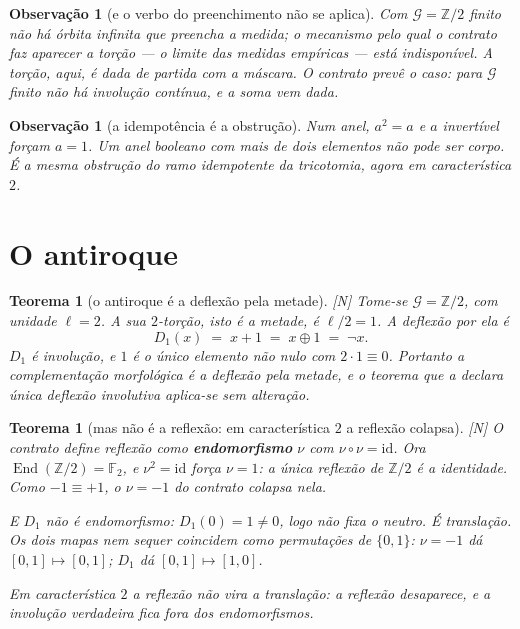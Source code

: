 \documentclass[12pt,a4paper]{article}
\newcommand{\ZZ}{\mathbb{Z}}
\newcommand{\FF}{\mathbb{F}_2}
\newcommand{\GG}{\mathcal{G}}
\newcommand{\est}[1]{\textsf{\footnotesize[#1]}}
\newtheorem{teorema}[definicao]{Teorema}
\newtheorem{observacao}[definicao]{Observação}
\begin{document}
\begin{observacao}[e o verbo do preenchimento não se aplica]\label{obs:naopreenche}
Com $\GG=\ZZ/2$ finito não há órbita infinita que preencha a medida; o mecanismo pelo qual o contrato faz
\emph{aparecer} a torção --- o limite das medidas empíricas --- está indisponível. A torção, aqui, é dada de
partida com a máscara. O contrato prevê o caso: para $\GG$ finito não há involução contínua, e a soma vem dada.
\end{observacao}

\begin{observacao}[a idempotência é a obstrução]\label{obs:idem}
Num anel, $a^2=a$ e $a$ invertível forçam $a=1$. Um anel booleano com mais de dois elementos não pode ser corpo.
É a mesma obstrução do ramo idempotente da tricotomia, agora em característica $2$.
\end{observacao}

\section{O antiroque}

\begin{teorema}[o antiroque é a deflexão pela metade]\label{teo:antiroquemetade}
\est{N} Tome-se $\GG=\ZZ/2$, com unidade $\ell=2$. A sua $2$-torção, isto é a metade, é $\ell/2=1$. A deflexão
por ela é
\[
D_1(x)\;=\;x+1\;=\;x\oplus1\;=\;\neg x .
\]
$D_1$ é involução, e $1$ é o único elemento não nulo com $2\cdot1\equiv0$. Portanto a complementação morfológica
é a deflexão pela metade, e o teorema que a declara única deflexão involutiva aplica-se sem alteração.
\end{teorema}

\begin{teorema}[mas não é a reflexão: em característica $2$ a reflexão colapsa]\label{teo:naoereflexao}
\est{N} O contrato define \emph{reflexão} como \textbf{endomorfismo} $\nu$ com $\nu\circ\nu=\mathrm{id}$. Ora
$\operatorname{End}(\ZZ/2)=\FF$, e $\nu^2=\mathrm{id}$ força $\nu=1$: a única reflexão de $\ZZ/2$ é a
\emph{identidade}. Como $-1\equiv+1$, o $\nu=-1$ do contrato colapsa nela.

\noindent E $D_1$ não é endomorfismo: $D_1(0)=1\neq0$, logo não fixa o neutro. É translação. Os dois mapas nem
sequer coincidem como permutações de $\{0,1\}$: $\nu=-1$ dá $[0,1]\mapsto[0,1]$; $D_1$ dá $[0,1]\mapsto[1,0]$.

\noindent \emph{Em característica $2$ a reflexão não vira a translação: a reflexão desaparece, e a involução
verdadeira fica fora dos endomorfismos.}
\end{teorema}
\end{document}
